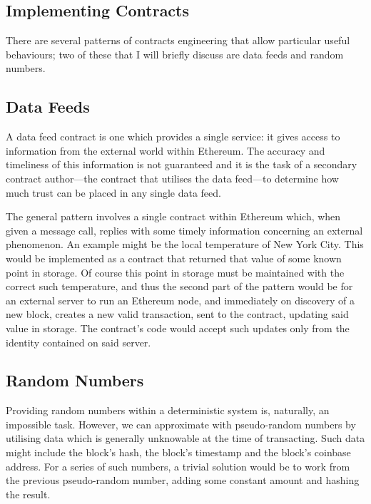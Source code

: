 \documentclass[9pt,oneside]{amsart}
\makeatletter
\newcommand*\eg{e.g.\@\xspace}
\makeatother
\begin{document}
\begin{multicols}{2}
%

\section{Implementing Contracts}

There are several patterns of contracts engineering that allow particular useful behaviours; two of these that I will briefly discuss are data feeds and random numbers. 

\subsection{Data Feeds}
A data feed contract is one which provides a single service: it gives access to information from the external world within Ethereum. The accuracy and timeliness of this information is not guaranteed and it is the task of a secondary contract author---the contract that utilises the data feed---to determine how much trust can be placed in any single data feed.

The general pattern involves a single contract within Ethereum which, when given a message call, replies with some timely information concerning an external phenomenon. An example might be the local temperature of New York City. This would be implemented as a contract that returned that value of some known point in storage. Of course this point in storage must be maintained with the correct such temperature, and thus the second part of the pattern would be for an external server to run an Ethereum node, and immediately on discovery of a new block, creates a new valid transaction, sent to the contract, updating said value in storage. The contract's code would accept such updates only from the identity contained on said server.

\subsection{Random Numbers}
Providing random numbers within a deterministic system is, naturally, an impossible task. However, we can approximate with pseudo-random numbers by utilising data which is generally unknowable at the time of transacting. Such data might include the block's hash, the block's timestamp and the block's coinbase address. For a series of such numbers, a trivial solution would be to work from the previous pseudo-random number, adding some constant amount and hashing the result.


\end{multicols}
\end{document}
